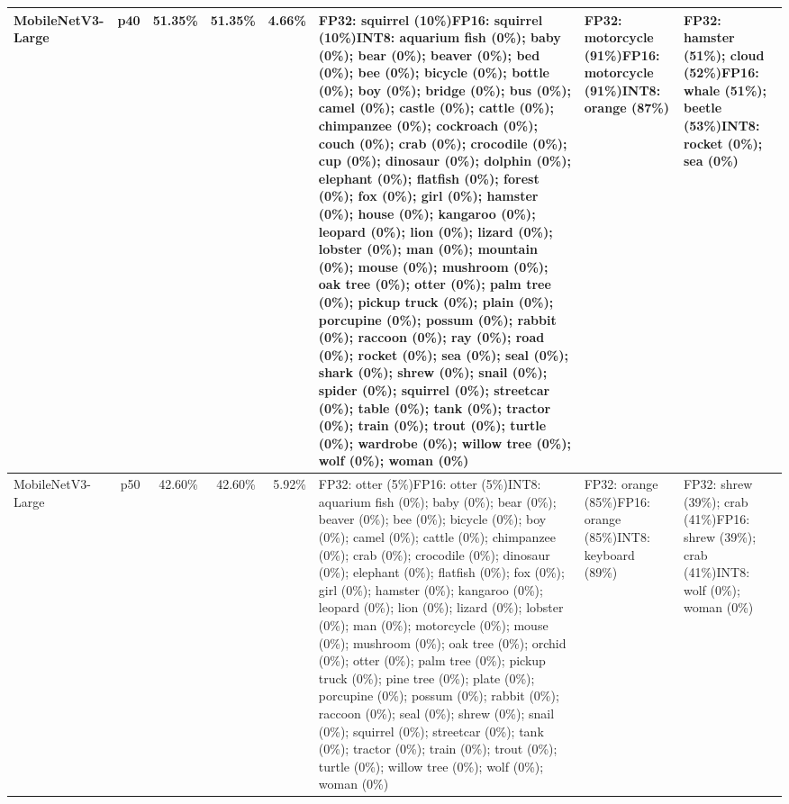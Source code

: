 \begin{longtable}{p{2.8cm} r r r r p{5.0cm} p{4.2cm} p{4.2cm}}
MobileNetV3-Large & p40 & 51.35\% & 51.35\% & 4.66\% & FP32: squirrel (10\%)\newline FP16: squirrel (10\%)\newline INT8: aquarium fish (0\%); baby (0\%); bear (0\%); beaver (0\%); bed (0\%); bee (0\%); bicycle (0\%); bottle (0\%); boy (0\%); bridge (0\%); bus (0\%); camel (0\%); castle (0\%); cattle (0\%); chimpanzee (0\%); cockroach (0\%); couch (0\%); crab (0\%); crocodile (0\%); cup (0\%); dinosaur (0\%); dolphin (0\%); elephant (0\%); flatfish (0\%); forest (0\%); fox (0\%); girl (0\%); hamster (0\%); house (0\%); kangaroo (0\%); leopard (0\%); lion (0\%); lizard (0\%); lobster (0\%); man (0\%); mountain (0\%); mouse (0\%); mushroom (0\%); oak tree (0\%); otter (0\%); palm tree (0\%); pickup truck (0\%); plain (0\%); porcupine (0\%); possum (0\%); rabbit (0\%); raccoon (0\%); ray (0\%); road (0\%); rocket (0\%); sea (0\%); seal (0\%); shark (0\%); shrew (0\%); snail (0\%); spider (0\%); squirrel (0\%); streetcar (0\%); table (0\%); tank (0\%); tractor (0\%); train (0\%); trout (0\%); turtle (0\%); wardrobe (0\%); willow tree (0\%); wolf (0\%); woman (0\%) & FP32: motorcycle (91\%)\newline FP16: motorcycle (91\%)\newline INT8: orange (87\%) & FP32: hamster (51\%); cloud (52\%)\newline FP16: whale (51\%); beetle (53\%)\newline INT8: rocket (0\%); sea (0\%) \\ \hline
MobileNetV3-Large & p50 & 42.60\% & 42.60\% & 5.92\% & FP32: otter (5\%)\newline FP16: otter (5\%)\newline INT8: aquarium fish (0\%); baby (0\%); bear (0\%); beaver (0\%); bee (0\%); bicycle (0\%); boy (0\%); camel (0\%); cattle (0\%); chimpanzee (0\%); crab (0\%); crocodile (0\%); dinosaur (0\%); elephant (0\%); flatfish (0\%); fox (0\%); girl (0\%); hamster (0\%); kangaroo (0\%); leopard (0\%); lion (0\%); lizard (0\%); lobster (0\%); man (0\%); motorcycle (0\%); mouse (0\%); mushroom (0\%); oak tree (0\%); orchid (0\%); otter (0\%); palm tree (0\%); pickup truck (0\%); pine tree (0\%); plate (0\%); porcupine (0\%); possum (0\%); rabbit (0\%); raccoon (0\%); seal (0\%); shrew (0\%); snail (0\%); squirrel (0\%); streetcar (0\%); tank (0\%); tractor (0\%); train (0\%); trout (0\%); turtle (0\%); willow tree (0\%); wolf (0\%); woman (0\%) & FP32: orange (85\%)\newline FP16: orange (85\%)\newline INT8: keyboard (89\%) & FP32: shrew (39\%); crab (41\%)\newline FP16: shrew (39\%); crab (41\%)\newline INT8: wolf (0\%); woman (0\%) \\ \hline

\end{longtable}
